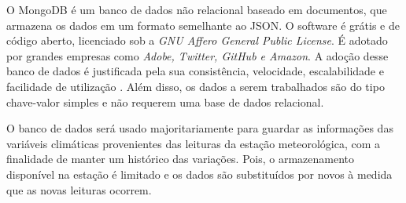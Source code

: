 O MongoDB é um banco de dados não relacional baseado em documentos, que armazena os dados em um formato semelhante ao JSON. O software é grátis e de código aberto, licenciado sob a \textit{GNU Affero General Public License}. É adotado por grandes empresas como \textit{Adobe, Twitter, GitHub e Amazon}. A adoção desse banco de dados é justificada pela sua consistência, velocidade, escalabilidade e facilidade de utilização \cite{SITEMONGODB}. Além disso, os dados a serem trabalhados são do tipo chave-valor simples e não requerem uma base de dados relacional.

O banco de dados será usado majoritariamente para guardar as informações das variáveis climáticas provenientes das leituras da estação meteorológica, com a finalidade de manter um histórico das variações. Pois, o armazenamento disponível na estação é limitado e os dados são substituídos por novos à medida que as novas leituras ocorrem.






